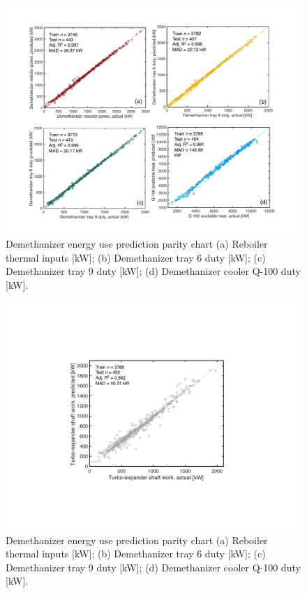 \documentclass[11pt]{report}
\begin{document}
\clearpage

\begin{figure}
\includegraphics[width=0.85\columnwidth]{images/demethanizer_duty.pdf}
\caption{Demethanizer energy use prediction parity chart (a) Reboiler thermal inputs [kW]; (b) Demethanizer tray 6 duty [kW]; (c) Demethanizer tray 9 duty [kW]; (d) Demethanizer cooler Q-100 duty [kW].}
\label{fig:demethanizer_duty}
\end{figure}
\begin{figure}
\includegraphics[width=0.85\columnwidth]{images/demethanizer_turboepander.pdf}
\caption{Demethanizer energy use prediction parity chart (a) Reboiler thermal inputs [kW]; (b) Demethanizer tray 6 duty [kW]; (c) Demethanizer tray 9 duty [kW]; (d) Demethanizer cooler Q-100 duty [kW].}
\label{fig:demethanizer_turboexpander}
\end{figure}
\end{document}
